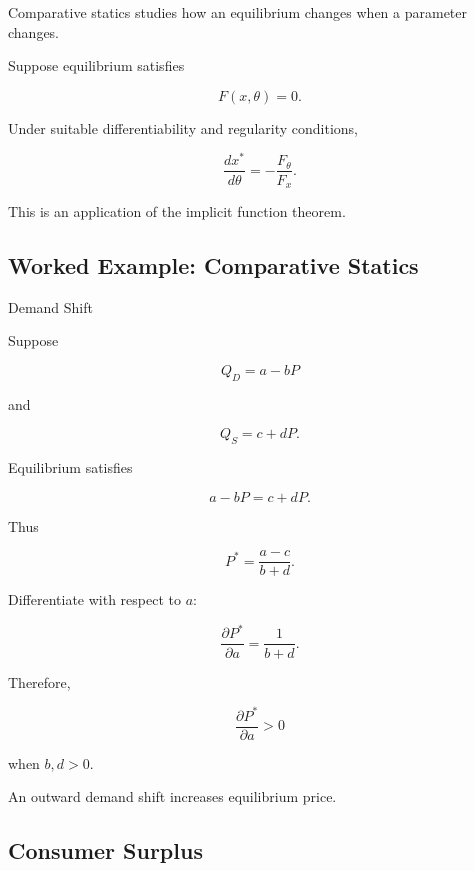 Comparative statics studies how an equilibrium changes when a parameter
changes.

Suppose equilibrium satisfies

\[
\boxed{
F(x,\theta)=0.
}
\]

Under suitable differentiability and regularity conditions,

\[
\boxed{
\frac{dx^*}{d\theta}
=
-
\frac{
F_\theta
}{
F_x
}.
}
\]

This is an application of the implicit function theorem.

\subsection{Worked Example: Comparative Statics}
\label{subsec:worked-comparative-statics}

\begin{workedexamplebox}{Demand Shift}

Suppose

\[
Q_D=a-bP
\]

and

\[
Q_S=c+dP.
\]

Equilibrium satisfies

\[
a-bP=c+dP.
\]

Thus

\[
P^*
=
\frac{a-c}{b+d}.
\]

Differentiate with respect to \(a\):

\[
\frac{\partial P^*}{\partial a}
=
\frac{1}{b+d}.
\]

Therefore,

\begin{answerbox}
\[
\boxed{
\frac{\partial P^*}{\partial a}>0
}
\]

when \(b,d>0\).
\end{answerbox}

An outward demand shift increases equilibrium price.

\end{workedexamplebox}

\subsection{Consumer Surplus}
\label{subsec:consumer-surplus}

